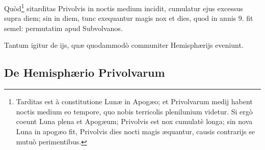 \documentclass[a4paper, 11pt, oneside, polutonikogreek, german]{article}
\begin{document}
Quòd\footnote{Tarditas est à constitutione Lunæ in Apogæo; et Privolvarum medij habent noctis medium eo tempore, quo nobis terricolis plenilunium videtur. Si ergò coeunt Luna plena et Apogæum; Privolvis est nox cumulatè longa; sin nova Luna in apogæo fit, Privolvis dies nocti magis æquantur, causis contrarijs se mutuò perimentibus.} sitarditas Privolvis in noctis medium incidit, cumulatur ejus excessus supra diem; sin in diem, tunc exequantur magis nox et dies, quod in annis 9. fit semel: permutatim apud Subvolvanos.

Tantum igitur de ijs, quæ quodammodò communiter Hemisphærijs eveniunt.

\subsection{De Hemisphærio Privolvarum}
\end{document}
